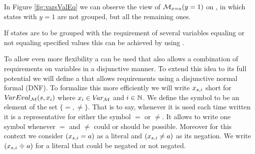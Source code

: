 \documentclass[preview]{standalone}
\begin{document}
In Figure \ref{fig:varsValEq} we can observe the view of $\viewparamvalueseq(y=1)$ on \chgph, in which states with $y=1$ are not grouped, but all the remaining ones.



If states are to be grouped with the requirement of several variables equaling or not equaling specified values this can be achieved by using \parllcompN.

To allow even more flexibility a \viewN can be used that also allows a combination of requirements on variables in a disjunctive manner. To extend this idea to its full potential we will define a \viewN that allows requirements using a disjunctive normal formal (DNF). To formalize this \viewN more efficiently we will write $\varstate[,i]$ short for $\vareval(\state, \var_i)$ where $x_i \in \vars$ and $i \in \natnums$. We define the symbol \eqorneq to be an element of the set $\{=,\neq\}$. That is to say, whenever it is used each time written it is a representative for either the symbol $=$ or $\neq$. It allows to write one symbol whenever $=$ and $\neq$ could or should be possible. Moreover for this context we consider $(\varstate[,i] = \varval)$ as a literal and $(\varstate[,i] \neq \varval)$ as its negation. We write $(\varstate[,i] \eqorneq \varval)$ for a literal that could be negated or not negated.
\end{document}
